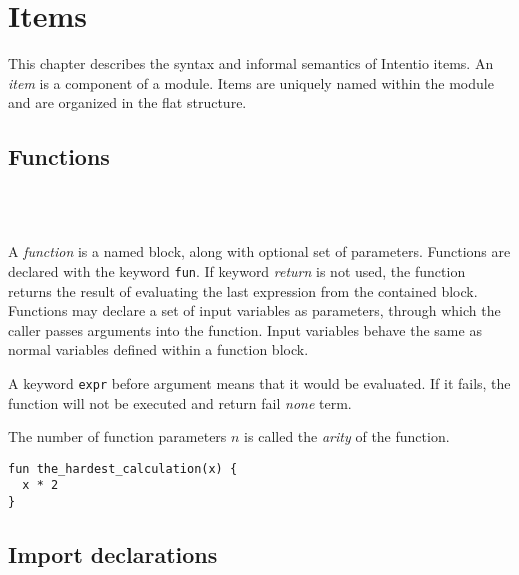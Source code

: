 \chapter{Items}

This chapter describes the syntax and informal semantics of Intentio items. An \emph{item} is a component of a module. Items are uniquely named within the module and are organized in the flat structure.

\begin{bnf}
   \eq    {}    
                \gorln {} 
\end{bnf}

\section{Functions}

\begin{bnf}
   \eq {} \  \ \term{(} \  \ \term{)} \  \\
   \eq {} \  \ \gtry{\term{,}}
\end{bnf}

A \emph{function} is a named block, along with optional set of parameters. Functions are declared with the keyword \lstinline{fun}. If keyword \emph{return} is not used, the function returns the result of evaluating the last expression from the contained block. Functions may declare a set of input variables as parameters, through which the caller passes arguments into the function. Input variables behave the same as normal variables defined within a function block.

A keyword \lstinline{expr} before argument means that it would be evaluated. If it fails, the function will not be executed and return fail \emph{none} term.

The number of function parameters $n$ is called the \emph{arity} of the function.

\begin{example}
\begin{lstlisting}
fun the_hardest_calculation(x) {
  x * 2
}
\end{lstlisting}
\end{example}

\section{Import declarations}

